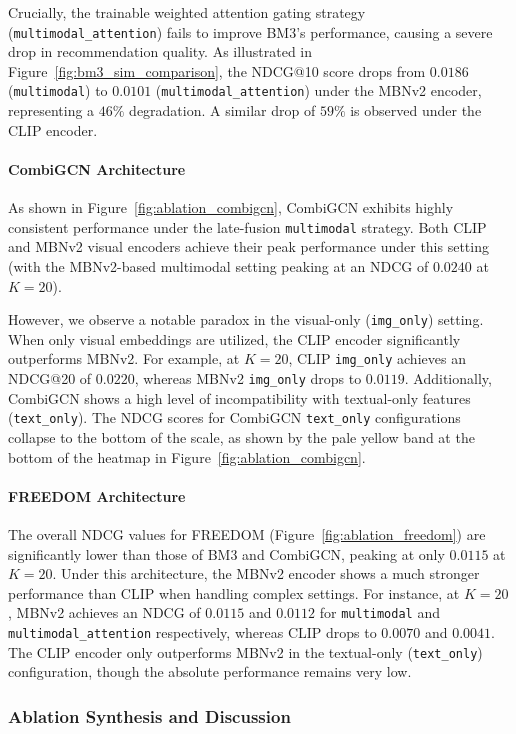 Crucially, the trainable weighted attention gating strategy (\texttt{multimodal\_attention}) fails to improve BM3's performance, causing a severe drop in recommendation quality. As illustrated in Figure~\ref{fig:bm3_sim_comparison}, the NDCG@10 score drops from $0.0186$ (\texttt{multimodal}) to $0.0101$ (\texttt{multimodal\_attention}) under the MBNv2 encoder, representing a $46\%$ degradation. A similar drop of $59\%$ is observed under the CLIP encoder.

\paragraph{CombiGCN Architecture}
As shown in Figure~\ref{fig:ablation_combigcn}, CombiGCN exhibits highly consistent performance under the late-fusion \texttt{multimodal} strategy. Both CLIP and MBNv2 visual encoders achieve their peak performance under this setting (with the MBNv2-based multimodal setting peaking at an NDCG of $0.0240$ at $K=20$). 

However, we observe a notable paradox in the visual-only (\texttt{img\_only}) setting. When only visual embeddings are utilized, the CLIP encoder significantly outperforms MBNv2. For example, at $K=20$, CLIP \texttt{img\_only} achieves an NDCG@20 of $0.0220$, whereas MBNv2 \texttt{img\_only} drops to $0.0119$. Additionally, CombiGCN shows a high level of incompatibility with textual-only features (\texttt{text\_only}). The NDCG scores for CombiGCN \texttt{text\_only} configurations collapse to the bottom of the scale, as shown by the pale yellow band at the bottom of the heatmap in Figure~\ref{fig:ablation_combigcn}.

\paragraph{FREEDOM Architecture}
The overall NDCG values for FREEDOM (Figure~\ref{fig:ablation_freedom}) are significantly lower than those of BM3 and CombiGCN, peaking at only $0.0115$ at $K=20$. Under this architecture, the MBNv2 encoder shows a much stronger performance than CLIP when handling complex settings. For instance, at $K=20$, MBNv2 achieves an NDCG of $0.0115$ and $0.0112$ for \texttt{multimodal} and \texttt{multimodal\_attention} respectively, whereas CLIP drops to $0.0070$ and $0.0041$. The CLIP encoder only outperforms MBNv2 in the textual-only (\texttt{text\_only}) configuration, though the absolute performance remains very low.

\subsubsection{Ablation Synthesis and Discussion}

